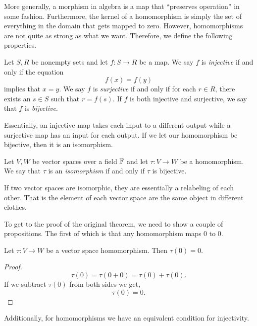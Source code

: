\documentclass[notitlepage]{simple}
\begin{document}
	More generally, a morphism in algebra is a map that ``preserves operation'' in some fashion.
	Furthermore, the kernel of a homomorphism is simply the set of everything in the domain that gets mapped to zero.
	However, homomorphisms are not quite as strong as what we want.
	Therefore, we define the following properties.

	\begin{definition}
		Let $S,R$ be nonempty sets and let $f:S\rightarrow R$ be a map.
		We say $f$ is \textit{injective} if and only if the equation
		\[
			f(x)=f(y)
		\]
		implies that $x=y$.
		We say $f$ is \textit{surjective} if and only if for each $r\in R$, there exists an $s\in S$ such that $r=f(s)$.
		If $f$ is both injective and surjective, we say that $f$ is \textit{bijective}.
	\end{definition}

	Essentially, an injective map takes each input to a different output while a surjective map has an input for each output.
	If we let our homomorphism be bijective, then it is an isomorphism.

	\begin{definition}
		Let $V,W$ be vector spaces over a field $\mathbb{F}$ and let $\tau:V\rightarrow W$ be a homomorphism.
		We say that $\tau$ is an \textit{isomorphism} if and only if $\tau$ is bijective.
	\end{definition}

	If two vector spaces are isomorphic, they are essentially a relabeling of each other.
	That is the element of each vector space are the same object in different clothes.

	To get to the proof of the original theorem, we need to show a couple of propositions.
	The first of which is that any homomorphism maps 0 to 0.

	\begin{proposition}
		Let $\tau:V\rightarrow W$ be a vector space homomorphism.
		Then $\tau(0)=0$.
	\end{proposition}
	\begin{proof}
		\[
			\tau(0)=\tau(0+0)=\tau(0)+\tau(0).
		\]
		If we subtract $\tau(0)$ from both sides we get,
		\[
			\tau(0)=0.
		\]
	\end{proof}

	Additionally, for homomorphisms we have an equivalent condition for injectivity.
\end{document}
